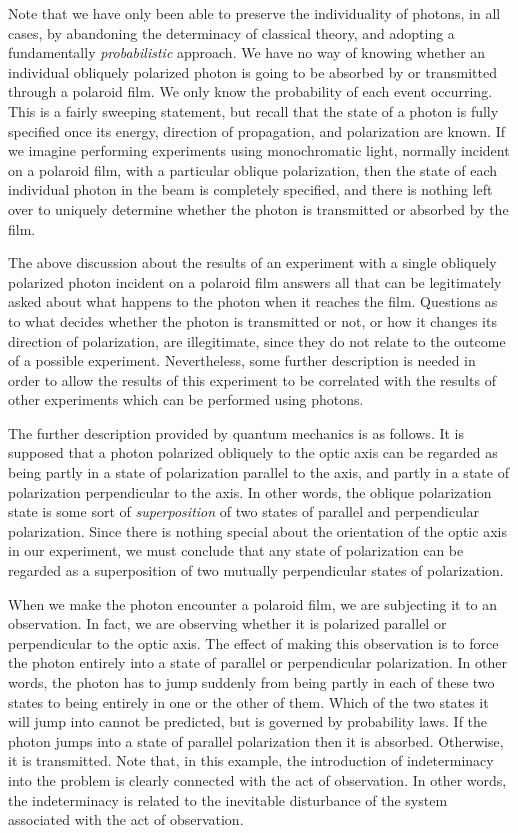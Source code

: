 Note that we have only been able to preserve the individuality of photons,
in all cases, by abandoning the determinacy of classical theory, and
adopting a fundamentally {\em probabilistic} approach. We have no
way of knowing whether an individual obliquely polarized photon is going to
be absorbed by or transmitted through a polaroid film. We only know the
probability of each event occurring. This is a fairly sweeping statement, but
recall that the state of a photon is fully specified once its energy, direction
of propagation, and polarization are known. If we imagine performing experiments
using monochromatic light, normally incident on a polaroid film, with a
particular oblique polarization, then the state of each individual photon
in the beam is completely specified, and there is nothing left over to
uniquely
determine whether the photon is transmitted or absorbed by the film. 

The above discussion about the results of an experiment with a single
obliquely polarized photon incident on a polaroid film answers all that can
be legitimately asked about what happens to the photon when it reaches the
film. Questions as to what decides whether the photon is transmitted
or not, or how it changes its direction of polarization, are illegitimate, since
they do not relate to the outcome of a possible experiment. Nevertheless, some further description
is needed in order to allow the results of this experiment to be correlated
with the results of other experiments which can be performed using photons. 

The further description provided by quantum mechanics is as follows. It is
supposed that a photon polarized obliquely to the optic axis can be regarded 
as being partly in a state of polarization parallel to the axis, and partly
in a state of polarization perpendicular to the axis. In other words, the 
oblique polarization state is some sort of {\em superposition} of two
states of parallel and perpendicular polarization. Since there is nothing special
about the orientation of the optic axis in our experiment, we must conclude
that any state of polarization can be regarded as a superposition of two
mutually perpendicular states of polarization. 

When we make the photon encounter a polaroid film, we are subjecting it to
an observation. In fact, we are observing whether it is polarized 
parallel or perpendicular to the optic axis. The effect of making this observation
is to force the photon entirely into a state of parallel or perpendicular
polarization. In other words, the photon has to jump suddenly from being partly
in each of these two states to being entirely in one or the other of them. Which
of the two states it will jump into cannot be predicted, but is governed
by probability laws. If the photon jumps into a state of parallel polarization then it
is absorbed. Otherwise, it is transmitted. Note that, in this example, the introduction
of 
indeterminacy into the problem  is clearly connected with the act of
observation.  In other words, the indeterminacy is related to the
inevitable disturbance of the system associated with the act of observation. 

